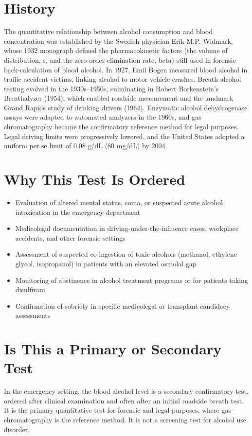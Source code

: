 \section*{History}
The quantitative relationship between alcohol consumption and blood concentration was established by the Swedish physician Erik M.P. Widmark, whose 1932 monograph defined the pharmacokinetic factors (the volume of distribution, r, and the zero-order elimination rate, beta) still used in forensic back-calculation of blood alcohol. In 1927, Emil Bogen measured blood alcohol in traffic accident victims, linking alcohol to motor vehicle crashes. Breath alcohol testing evolved in the 1930s--1950s, culminating in Robert Borkenstein's Breathalyzer (1954), which enabled roadside measurement and the landmark Grand Rapids study of drinking drivers (1964). Enzymatic alcohol dehydrogenase assays were adapted to automated analyzers in the 1960s, and gas chromatography became the confirmatory reference method for legal purposes. Legal driving limits were progressively lowered, and the United States adopted a uniform per se limit of 0.08 g/dL (80 mg/dL) by 2004.
\section*{Why This Test Is Ordered}
\begin{itemize}
  \item Evaluation of altered mental status, coma, or suspected acute alcohol intoxication in the emergency department
  \item Medicolegal documentation in driving-under-the-influence cases, workplace accidents, and other forensic settings
  \item Assessment of suspected co-ingestion of toxic alcohols (methanol, ethylene glycol, isopropanol) in patients with an elevated osmolal gap
  \item Monitoring of abstinence in alcohol treatment programs or for patients taking disulfiram
  \item Confirmation of sobriety in specific medicolegal or transplant candidacy assessments
\end{itemize}
\section*{Is This a Primary or Secondary Test}
In the emergency setting, the blood alcohol level is a secondary confirmatory test, ordered after clinical examination and often after an initial roadside breath test. It is the primary quantitative test for forensic and legal purposes, where gas chromatography is the reference method. It is not a screening test for alcohol use disorder.
